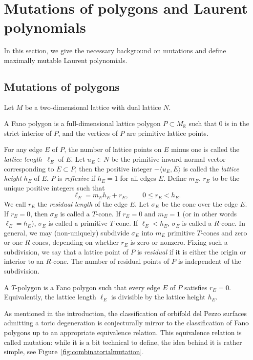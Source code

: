 \documentclass[11pt]{article}
\numberwithin{equation}{section}
\newcommand{\RR}{\mathbb{R}}
\begin{document}
\section{Mutations of polygons and Laurent polynomials}\label{sec:combinatorics}
In this section, we give the necessary background on mutations and define maximally mutable Laurent polynomials.
	\subsection{Mutations of polygons}\label{sec:mutationsofpolygons}
Let $M$ be a two-dimensional lattice with dual lattice $N$.
	\begin{Definition}\label{def:Fanopolygon}
		A Fano polygon is a full-dimensional lattice polygon $P \subset M_\RR$ such that $0$ is in the strict interior of $P$, and the vertices of $P$ are primitive lattice points.
	\end{Definition}
For any edge $E$ of $P$, the number of lattice points on $E$ minus one is called the \emph{lattice length}~$\ell_E$ of $E$. Let $u_E \in N$ be the primitive inward normal vector corresponding to $E \subset P$, then the positive integer $-\langle u_E, E \rangle$ is called the \emph{lattice height} $h_E$ of $E$.
$P$ is \emph{reflexive} if $h_E= 1$ for all edges $E$. Define $m_E$, $r_E$ to be the unique positive integers such that
\[
\ell_E=m_Eh_E+r_E, \qquad 0 \leq r_E<h_E.
\]
We call $r_E$ the \emph{residual length} of the edge $E$. Let $\sigma_E$ be the cone over the edge $E$.
If $r_E=0$, then $\sigma_E$ is called a $T$-cone. If $r_E=0$ and $m_E=1$ (or in other words $\ell_E=h_E$), $\sigma_E$ is called a primitive $T$-cone. If $\ell_E<h_E$, $\sigma_E$ is called a $R$-cone.
In general, we may (non-uniquely) subdivide $\sigma_E$ into $m_E$ primitive $T$-cones and zero or one $R$-cones, depending on whether $r_E$ is zero or nonzero.
Fixing such a subdivision, we say that a lattice point of $P$ is \emph{residual} if it is either the origin or interior to an $R$-cone. The number of residual points of $P$ is independent of the subdivision.
	\begin{Definition}
	A $T$-polygon is a Fano polygon such that every edge $E$ of $P$ satisfies $r_E=0$. Equivalently, the lattice length $\ell_E$ is divisible by the lattice height $h_E$.
\end{Definition}
As mentioned in the introduction, the classification of orbifold del Pezzo surfaces admitting a toric degeneration is conjecturally mirror to the classification of Fano polygons up to an appropriate equivalence relation. This equivalence relation is called mutation: while it is a bit technical to define, the idea behind it is rather simple, see Figure~\ref{fig:combinatorialmutation}.
\end{document}
